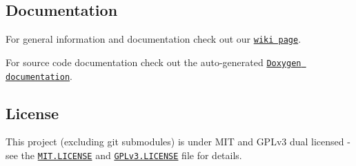 \subsection*{Documentation}


\begin{DoxyItemize}
\item For general information and documentation check out our \href{https://github.com/Autonomous-Racing-PG/ar-tu-do/wiki}{\tt wiki page}.
\item For source code documentation check out the auto-\/generated \href{https://autonomous-racing-pg.github.io/ar-tu-do/html/index.html}{\tt Doxygen documentation}.
\end{DoxyItemize}

\subsection*{License}

This project (excluding git submodules) is under M\+IT and G\+P\+Lv3 dual licensed -\/ see the \href{MIT.LICENSE}{\tt M\+I\+T.\+L\+I\+C\+E\+N\+SE} and \href{GPLv3.LICENSE}{\tt G\+P\+Lv3.\+L\+I\+C\+E\+N\+SE} file for details. 